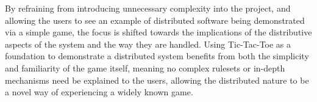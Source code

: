 \documentclass[conference]{IEEEtran}
\begin{document}
By refraining from introducing unnecessary complexity into the project, and allowing the users to see an example of distributed software being demonstrated via a simple game, the focus is shifted towards the implications of the distributive aspects of the system and the way they are handled. Using Tic-Tac-Toe as a foundation to demonstrate a distributed system benefits from both the simplicity and familiarity of the game itself, meaning no complex rulesets or in-depth mechanisms need be explained to the users, allowing the distributed nature to be a novel way of experiencing a widely known game.

%
%


%
%
\end{document}
